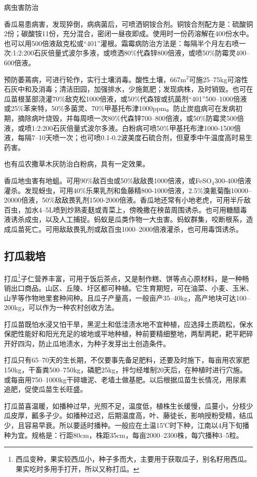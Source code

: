 \documentclass{ctexbook}
\begin{document}
病虫害防治

香瓜易患病害，发现猝倒，病病菌后，可喷洒铜铵合剂。铜铵合剂配方是：硫酸铜2份；碳酸铵11份，充分混合，密闭一昼夜即成。使用时一份药溶解在400份水中。也可以用500倍液敌克松或“401”灌根。霜霉病防治方法是：每隔半个月左右喷一次:1:2:200石灰倍量式波尔多液，或喷洒80\%代森锌800倍液，或喷50\%防霉灵400--600倍液。

预防萎蔫病，可进行轮作，实行土壤消毒。酸性土壤，667m$^2$可施25--75kg可溶性石灰中和及消毒；清洁田园，加强排水，少施氮肥；发现病株，及时销毁。也可在瓜苗根茎部浇灌70\%敌克松1000倍液，或50\%代森铵或抗菌剂“401”500--1000倍液或25\%苯来特，50\%多菌灵、70\%甲基托布津1000ppm。防止炭疽病可在发病初期，摘除病叶烧毁，并每周喷一次80\%代森锌700--800倍液，或50\%防霉灵500倍液，或喷1:2:200石灰倍量式波尔多液。白粉病可喷50\%甲基托布津1000-1500倍液，每隔7--10天喷一次；也可喷0.1-0.2波美度石硫合剂，但夏季中午温度高时易生药害。

也有瓜农撒草木灰防治白粉病，具有一定效果。

香瓜地虫害有地蛆。可用90\%敌百虫或50\%敌敌畏1000倍液，或FeSO$_4$300-400倍液灌杀。发现蚜虫，可用40\%乐果乳剂和鱼藤精800-1000倍液，2.5\%溴氰菊酯10000--20000倍液，50\%敌敌畏乳剂1500-2000倍液。香瓜地还常有小地老虎，可用半斤敌百虫，加水4--5L喷到炒熟麦麸或青菜上，傍晚撒在秧苗周围诱杀。也可用糖醋毒液诱杀成虫，以及人工捕捉。蚂蚁是瓜类作物一大虫害。蚂蚁群集，咬断根系，造成瓜苗死亡。可用敌敌畏乳剂或敌百虫1000--2000倍液灌杀，也可用毒饵诱杀。
\subsection{打瓜栽培}
打瓜\footnote{西瓜变种，果实较西瓜小，种子多而大，主要用于获取瓜子，别名籽用西瓜。果实吃时多用手打开，所以又称打瓜。}子仁营养丰富，可用于饭后茶点，又是制作糕、饼等点心原材料，是一种畅销出口商品。山区、丘陵、圩区都可种植。它生育期短，可在油菜、小麦、玉米、山芋等作物地里套种间种。且瓜子产量高，一般亩产35--40kg，高产地块可达100--200kg，可以作为一种农村创收方法。

打瓜苗既怕水浸又怕干旱，黑泥土和低洼渍水地不宜种植，应选择土质疏松，保水保肥性能好和阳光充足的坡地或平地种植，种前要精细整地，两犁两耙，耙平耙碎开好四沟，防止瓜地渍水，为种子发芽出土创造条件。

打瓜只有65--70天的生长期，不仅要事先备足肥料，还要及时施下，每亩用农家肥150kg，干畜粪500--750kg，磷肥25kg，拌匀经堆制20天后，在种植时进行穴施。或每亩用750--1000kg干碎塘泥、老墙土做基肥。以后根据瓜苗生长情况，用尿素追肥，促使瓜苗生长旺盛。

打瓜苗喜温暖，如播种过早，光照不足，温度低，植株生长缓慢，瓜蔓小，分枝少瓜皮厚，瓤多子少。如播种过迟，后期温度高，叶、藤徒长，影响授粉受精，结瓜少，且容易早衰。所以要适时播种。一般应在土温15℃时下种，江南以4月下旬播种为宜。规格是：行距80cm，株距35cm，每亩2000--2300株，每穴播种3--5粒。
\end{document}
